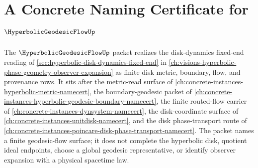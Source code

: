 \chapter{A Concrete Naming Certificate for $\HyperbolicGeodesicFlowUp$}
\label{ch:concrete-instances-hyperbolic-geodesic-flow-namecert}

The $\HyperbolicGeodesicFlowUp$ packet realizes the disk-dynamics fixed-end reading of \autoref{sec:hyperbolic-disk-dynamics-fixed-end} in \autoref{ch:visions-hyperbolic-phase-geometry-observer-expansion} as finite disk metric, boundary, flow, and provenance rows. It sits after the metric-read surface of \autoref{ch:concrete-instances-hyperbolic-metric-namecert}, the boundary-geodesic packet of \autoref{ch:concrete-instances-hyperbolic-geodesic-boundary-namecert}, the finite routed-flow carrier of \autoref{ch:concrete-instances-dynsystem-namecert}, the disk-coordinate surface of \autoref{ch:concrete-instances-unitdisk-namecert}, and the disk phase-transport route of \autoref{ch:concrete-instances-poincare-disk-phase-transport-namecert}. The packet names a finite geodesic-flow surface; it does not complete the hyperbolic disk, quotient ideal endpoints, choose a global geodesic representative, or identify observer expansion with a physical spacetime law.

